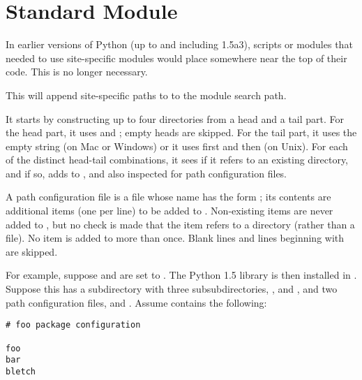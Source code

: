 \section{Standard Module }
\label{module-site}


In earlier versions of Python (up to and including 1.5a3), scripts or
modules that needed to use site-specific modules would place
 somewhere near the top of their code.  This is no
longer necessary.

This will append site-specific paths to to the module search path.

It starts by constructing up to four directories from a head and a
tail part.  For the head part, it uses  and
; empty heads are skipped.  For
the tail part, it uses the empty string (on Mac or Windows) or it uses
first  and then
 (on Unix).  For each of the distinct head-tail
combinations, it sees if it refers to an existing directory, and if
so, adds to , and also inspected for path configuration
files.

A path configuration file is a file whose name has the form
; its contents are additional items (one
per line) to be added to .  Non-existing items are
never added to , but no check is made that the item
refers to a directory (rather than a file).  No item is added to
 more than once.  Blank lines and lines beginning with
\code{\#} are skipped.

For example, suppose  and  are
set to .  The Python 1.5 library is then installed in
.  Suppose this has a subdirectory
 with three subsubdirectories,
,  and , and two path configuration
files,  and .  Assume 
contains the following:

\bcode\begin{verbatim}
# foo package configuration

foo
bar
bletch
\end{verbatim}\ecode

